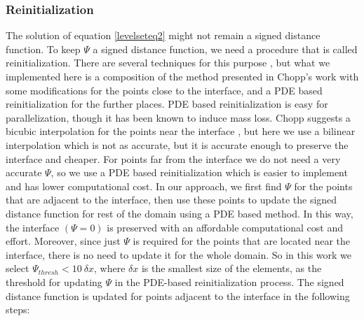 \documentclass[review]{elsarticle}
\begin{document}
\subsubsection{Reinitialization} \label{reinitialization}
The solution of equation \eqref{levelseteq2} might not remain a signed distance function. To keep $\varPsi$ a signed distance function, we need a procedure that is called 
reinitialization. There are several techniques for this purpose \cite{Osher1988}, but what we implemented here is a composition of the method presented in Chopp's work \cite{Chopp2001} with 
some modifications for the points close to the interface, and a PDE based reinitialization for the further places\cite{Sussman1994a}.
PDE based reinitialization is easy for parallelization, though it has been known to induce mass loss. Chopp suggests a bicubic interpolation for the points near the interface \cite{Chopp2001},
but here we use a bilinear interpolation which is not as accurate, but it is accurate enough to preserve the interface and cheaper. 
For points far from the interface we do not need a very accurate $\varPsi$, so we use a PDE based reinitialization which is easier to implement and has lower computational cost. 
In our approach, we first find $\varPsi$ for the points that are adjacent to the interface, then use these points to update the signed distance function for rest of the domain using a PDE based method.
In this way, the interface $( \varPsi=0 )$ is preserved with an affordable computational cost and effort. Moreover, since just $\varPsi$ is required for the points that are located near the interface, 
there is no need to update it for  the whole domain. So in this work we select $\varPsi_{thresh}<10\ \delta x$, where $\delta x$ is the smallest size of the elements, 
as the threshold for updating $\varPsi$ in the PDE-based reinitialization process.
The signed distance function is updated for  points  adjacent to the interface in the following steps:
\end{document}
